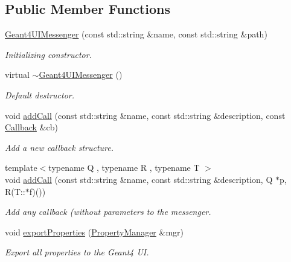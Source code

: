 \subsection*{Public Member Functions}
\begin{DoxyCompactItemize}
\item 
\hyperlink{class_d_d4hep_1_1_simulation_1_1_geant4_u_i_messenger_a869808e8fd7f7611767389c6eb655fbd}{Geant4\+U\+I\+Messenger} (const std\+::string \&name, const std\+::string \&path)
\begin{DoxyCompactList}\small\item\em Initializing constructor. \end{DoxyCompactList}\item 
virtual \hyperlink{class_d_d4hep_1_1_simulation_1_1_geant4_u_i_messenger_aad6ad70233b8f95d1cdd09661ad0d510}{$\sim$\+Geant4\+U\+I\+Messenger} ()
\begin{DoxyCompactList}\small\item\em Default destructor. \end{DoxyCompactList}\item 
void \hyperlink{class_d_d4hep_1_1_simulation_1_1_geant4_u_i_messenger_a42b963fb8d55b8fa2f1586098b383d61}{add\+Call} (const std\+::string \&name, const std\+::string \&description, const \hyperlink{class_d_d4hep_1_1_callback}{Callback} \&cb)
\begin{DoxyCompactList}\small\item\em Add a new callback structure. \end{DoxyCompactList}\item 
{\footnotesize template$<$typename Q , typename R , typename T $>$ }\\void \hyperlink{class_d_d4hep_1_1_simulation_1_1_geant4_u_i_messenger_a7c29eaaa89608d731289053ef12d2657}{add\+Call} (const std\+::string \&name, const std\+::string \&description, Q $\ast$p, R(T\+::$\ast$f)())
\begin{DoxyCompactList}\small\item\em Add any callback (without parameters to the messenger. \end{DoxyCompactList}\item 
void \hyperlink{class_d_d4hep_1_1_simulation_1_1_geant4_u_i_messenger_accdcb3b4978b3ed83c400ca7e6ced993}{export\+Properties} (\hyperlink{class_d_d4hep_1_1_property_manager}{Property\+Manager} \&mgr)
\begin{DoxyCompactList}\small\item\em Export all properties to the Geant4 UI. \end{DoxyCompactList}\item 

\end{DoxyCompactItemize}
